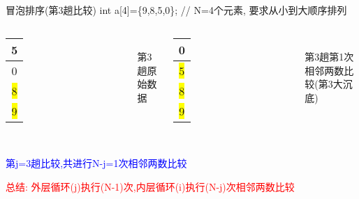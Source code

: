 \begin{frame}{冒泡排序(第3趟比较)}
int a[4]=\{9,8,5,0\}; // N=4个元素, 要求从小到大顺序排列
\begin{columns}[T]
	\begin{tabular}{|c|}
		\hline 
		5 \\ 
		\hline 
		0 \\ 
		\hline 
		\colorbox{yellow}{8} \\ 
		\hline
		\colorbox{yellow}{9} \\
		\hline 
	\end{tabular}\\ 
	第3趟原始数据
	\pause
	\begin{tabular}{|c|}
		\hline 
		0 \\ 
		\hline 
		\colorbox{yellow}{5} \\ 
		\hline 
		\colorbox{yellow}{8} \\ 
		\hline
		\colorbox{yellow}{9} \\
		\hline  
	\end{tabular}\\ 
	第3趟第1次相邻两数比较(第3大沉底)
\end{columns}
~\\
\textcolor{blue}{第j=3趟比较,共进行N-j=1次相邻两数比较}

\textcolor{red}{总结: 外层循环(j)执行(N-1)次,内层循环(i)执行(N-j)次相邻两数比较}
\end{frame}

